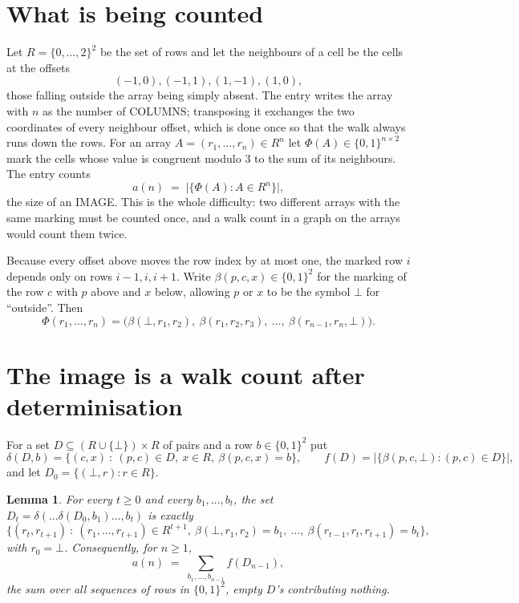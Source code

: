 \documentclass[11pt,a4paper]{article}
\theoremstyle{plain}
\newtheorem{lemma}[theorem]{Lemma}
\theoremstyle{definition}
\begin{document}
\section{What is being counted}

Let $R=\{0,\dots,2\}^{2}$ be the set of rows and let the neighbours of a cell be the
cells at the offsets
\[
(-1,0), (-1,1), (1,-1), (1,0),
\]
those falling outside the array being simply absent. The entry writes the array with $n$ as the number of COLUMNS; transposing it exchanges the two coordinates of every neighbour offset, which is done once so that the walk always runs down the rows. For an array
$A=(r_1,\dots,r_n)\in R^n$ let $\Phi(A)\in\{0,1\}^{n\times2}$ mark the cells whose value
is congruent modulo 3 to the sum of its neighbours. The entry counts
\[
a(n)\;=\;\bigl|\{\Phi(A):A\in R^n\}\bigr| ,
\]
the size of an IMAGE. This is the whole difficulty: two different arrays with the same marking
must be counted once, and a walk count in a graph on the arrays would count them twice.

Because every offset above moves the row index by at most one, the marked row $i$ depends only
on rows $i-1,i,i+1$. Write $\beta(p,c,x)\in\{0,1\}^{2}$ for the marking of the row $c$
with $p$ above and $x$ below, allowing $p$ or $x$ to be the symbol $\bot$ for ``outside''.
Then
\[
\Phi(r_1,\dots,r_n)=\bigl(\beta(\bot,r_1,r_2),\ \beta(r_1,r_2,r_3),\ \dots,\
\beta(r_{n-1},r_n,\bot)\bigr).
\]

\section{The image is a walk count after determinisation}

For a set $D\subseteq(R\cup\{\bot\})\times R$ of pairs and a row $b\in\{0,1\}^{2}$ put
\[
\delta(D,b)=\{(c,x)\ :\ (p,c)\in D,\ x\in R,\ \beta(p,c,x)=b\},\qquad
f(D)=\bigl|\{\beta(p,c,\bot):(p,c)\in D\}\bigr| ,
\]
and let $D_0=\{(\bot,r):r\in R\}$.

\begin{lemma}\label{lem:det}
For every $t\ge0$ and every $b_1,\dots,b_t$, the set
$D_t=\delta(\dots\delta(D_0,b_1)\dots,b_t)$ is exactly
\[
\{(r_t,r_{t+1})\ :\ (r_1,\dots,r_{t+1})\in R^{t+1},\ \beta(\bot,r_1,r_2)=b_1,\ \dots,\
\beta(r_{t-1},r_t,r_{t+1})=b_t\} ,
\]
with $r_0=\bot$. Consequently, for $n\ge1$,
\[
a(n)\;=\;\sum_{b_1,\dots,b_{n-1}}f(D_{n-1}),
\]
the sum over all sequences of rows in $\{0,1\}^{2}$, empty $D$'s contributing nothing.
\end{lemma}
\end{document}
